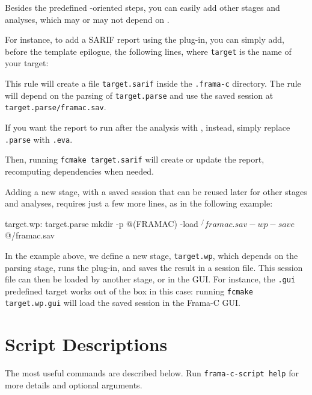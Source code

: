 Besides the predefined \Value-oriented steps, you can easily add other stages
and analyses, which may or may not depend on \Value.

For instance, to add a SARIF report using the  plug-in,
you can simply add, before the template epilogue, the following lines, where
\texttt{target} is the name of your target:


This rule will create a file \texttt{target.sarif} inside the \texttt{.frama-c}
directory. The rule will depend on the parsing of \texttt{target.parse} and
use the saved session at \texttt{target.parse/framac.sav}.

If you want the report to run after the analysis with \Value, instead, simply
replace \texttt{.parse} with \texttt{.eva}.

Then, running \texttt{fcmake target.sarif} will create or update the report,
recomputing dependencies when needed.

Adding a new stage, with a saved session that can be reused later for other
stages and analyses, requires just a few more lines, as in the following
example:

\begin{makefilecode}
target.wp: target.parse
	mkdir -p $@
	$(FRAMAC) -load $^/framac.sav -wp -save $@/framac.sav
\end{makefilecode}

In the example above, we define a new stage, \texttt{target.wp}, which depends
on the parsing stage, runs the  plug-in, and saves the result in a
session file. This session file can then be loaded by another stage,
or in the GUI. For instance, the \texttt{.gui} predefined target works out of
the box in this case: running \texttt{fcmake target.wp.gui} will load the saved
session in the Frama-C GUI.

\section{Script Descriptions}
\label{sec:script-descriptions}

The most useful commands are described below.
Run \texttt{frama-c-script help} for more details and optional arguments.

